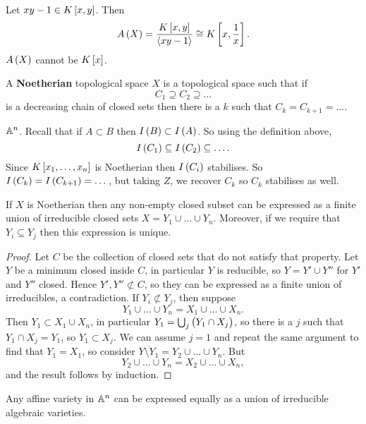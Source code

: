 \begin{example}
Let $ xy - 1 \in K\sbr{x, y} $. Then
$$ A\br{X} = \dfrac{K\sbr{x, y}}{\abr{xy - 1}} \cong K\sbr{x, \dfrac{1}{x}}. $$
$ A\br{X} $ cannot be $ K\sbr{x} $.
\end{example}

\begin{definition}
A \textbf{Noetherian} topological space $ X $ is a topological space such that if
$$ C_1 \supseteq C_2 \supseteq \dots $$
is a decreasing chain of closed sets then there is a $ k $ such that $ C_k = C_{k + 1} = \dots $.
\end{definition}

\begin{example}
$ \AA^n $. Recall that if $ A \subset B $ then $ I\br{B} \subset I\br{A} $. So using the definition above,
$$ I\br{C_1} \subseteq I\br{C_2} \subseteq \dots. $$
Since $ K\sbr{x_1, \dots, x_n} $ is Noetherian then $ I\br{C_i} $ stabilises. So $ I\br{C_k} = I\br{C_{k + 1}} = \dots $, but taking $ Z $, we recover $ C_k $ so $ C_k $ stabilises as well.
\end{example}

\pagebreak

\begin{theorem}
If $ X $ is Noetherian then any non-empty closed subset can be expressed as a finite union of irreducible closed sets $ X = Y_1 \cup \dots \cup Y_n $. Moreover, if we require that $ Y_i \subseteq Y_j $ then this expression is unique.
\end{theorem}

\begin{proof}
Let $ C $ be the collection of closed sets that do not satisfy that property. Let $ Y $ be a minimum closed inside $ C $, in particular $ Y $ is reducible, so $ Y = Y' \cup Y'' $ for $ Y' $ and $ Y'' $ closed. Hence $ Y', Y'' \not\subset C $, so they can be expressed as a finite union of irreducibles, a contradiction. If $ Y_i \not\subset Y_j $, then suppose
$$ Y_1 \cup \dots \cup Y_n = X_1 \cup \dots \cup X_n. $$
Then $ Y_1 \subset X_1 \cup X_n $, in particular $ Y_1 = \bigcup_j \br{Y_1 \cap X_j} $, so there is a $ j $ such that $ Y_1 \cap X_j = Y_1 $, so $ Y_1 \subset X_j $. We can assume $ j = 1 $ and repeat the same argument to find that $ Y_1 = X_1 $, so consider $ \overline{Y \setminus Y_1} = Y_2 \cup \dots \cup Y_n $. But
$$ Y_2 \cup \dots \cup Y_n = X_2 \cup \dots \cup X_n, $$
and the result follows by induction.
\end{proof}

\begin{corollary}
Any affine variety in $ \AA^n $ can be expressed equally as a union of irreducible algebraic varieties.
\end{corollary}

